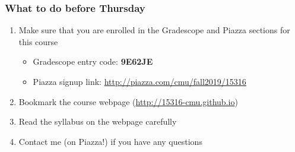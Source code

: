 \documentclass[10pt,handout]{beamer}
\begin{document}

\begin{frame}

\frametitle{What to do before Thursday}

\begin{enumerate}
  \item Make sure that you are enrolled in the Gradescope and Piazza sections for this course
  \begin{itemize}
    \item Gradescope entry code: \textbf{9E62JE}
    \item Piazza signup link: \url{http://piazza.com/cmu/fall2019/15316}
  \end{itemize}
  \item Bookmark the course webpage (\url{http://15316-cmu.github.io})
  \item Read the syllabus on the webpage carefully
  \item Contact me (on Piazza!) if you have any questions
\end{enumerate}

\end{frame}
\end{document}
